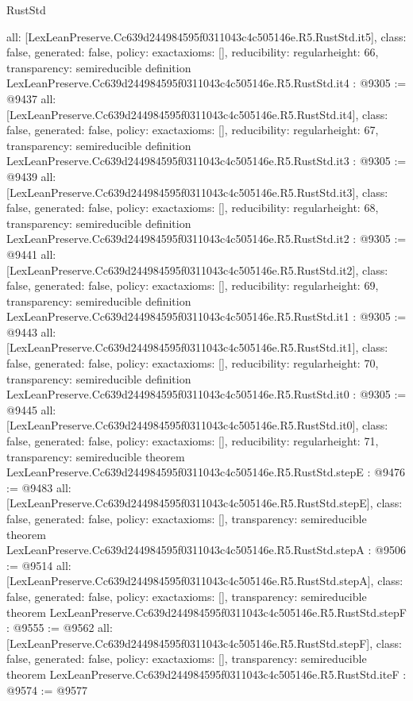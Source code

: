 \begin{lexlean}{RustStd}
\begin{coremodule}
{  all: [LexLeanPreserve.Cc639d244984595f0311043c4c505146e.R5.RustStd.it5],
  class: false,
  generated: false,
  policy: exact{axioms: []},
  reducibility: regular{height: 66},
  transparency: semireducible
}
definition LexLeanPreserve.Cc639d244984595f0311043c4c505146e.R5.RustStd.it4 : @9305 := @9437 {
  all: [LexLeanPreserve.Cc639d244984595f0311043c4c505146e.R5.RustStd.it4],
  class: false,
  generated: false,
  policy: exact{axioms: []},
  reducibility: regular{height: 67},
  transparency: semireducible
}
definition LexLeanPreserve.Cc639d244984595f0311043c4c505146e.R5.RustStd.it3 : @9305 := @9439 {
  all: [LexLeanPreserve.Cc639d244984595f0311043c4c505146e.R5.RustStd.it3],
  class: false,
  generated: false,
  policy: exact{axioms: []},
  reducibility: regular{height: 68},
  transparency: semireducible
}
definition LexLeanPreserve.Cc639d244984595f0311043c4c505146e.R5.RustStd.it2 : @9305 := @9441 {
  all: [LexLeanPreserve.Cc639d244984595f0311043c4c505146e.R5.RustStd.it2],
  class: false,
  generated: false,
  policy: exact{axioms: []},
  reducibility: regular{height: 69},
  transparency: semireducible
}
definition LexLeanPreserve.Cc639d244984595f0311043c4c505146e.R5.RustStd.it1 : @9305 := @9443 {
  all: [LexLeanPreserve.Cc639d244984595f0311043c4c505146e.R5.RustStd.it1],
  class: false,
  generated: false,
  policy: exact{axioms: []},
  reducibility: regular{height: 70},
  transparency: semireducible
}
definition LexLeanPreserve.Cc639d244984595f0311043c4c505146e.R5.RustStd.it0 : @9305 := @9445 {
  all: [LexLeanPreserve.Cc639d244984595f0311043c4c505146e.R5.RustStd.it0],
  class: false,
  generated: false,
  policy: exact{axioms: []},
  reducibility: regular{height: 71},
  transparency: semireducible
}
theorem LexLeanPreserve.Cc639d244984595f0311043c4c505146e.R5.RustStd.stepE : @9476 := @9483 {
  all: [LexLeanPreserve.Cc639d244984595f0311043c4c505146e.R5.RustStd.stepE],
  class: false,
  generated: false,
  policy: exact{axioms: []},
  transparency: semireducible
}
theorem LexLeanPreserve.Cc639d244984595f0311043c4c505146e.R5.RustStd.stepA : @9506 := @9514 {
  all: [LexLeanPreserve.Cc639d244984595f0311043c4c505146e.R5.RustStd.stepA],
  class: false,
  generated: false,
  policy: exact{axioms: []},
  transparency: semireducible
}
theorem LexLeanPreserve.Cc639d244984595f0311043c4c505146e.R5.RustStd.stepF : @9555 := @9562 {
  all: [LexLeanPreserve.Cc639d244984595f0311043c4c505146e.R5.RustStd.stepF],
  class: false,
  generated: false,
  policy: exact{axioms: []},
  transparency: semireducible
}
theorem LexLeanPreserve.Cc639d244984595f0311043c4c505146e.R5.RustStd.iteF : @9574 := @9577 {
}
\end{coremodule}
\end{lexlean}

